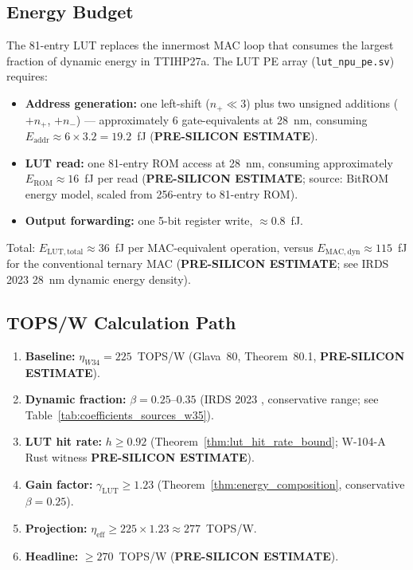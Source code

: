 \subsection{Energy Budget}

The 81-entry LUT replaces the innermost MAC loop that consumes the largest
fraction of dynamic energy in TTIHP27a.  The LUT PE array (\texttt{lut\_npu\_pe.sv})
requires:
\begin{itemize}
  \item \textbf{Address generation:} one left-shift ($n_{+} \ll 3$) plus two
    unsigned additions ($+n_{+}$, $+n_{-}$) — approximately 6 gate-equivalents
    at 28~nm, consuming $E_{\mathrm{addr}} \approx 6 \times 3.2 = 19.2$~fJ
    (\textbf{PRE-SILICON ESTIMATE}).
  \item \textbf{LUT read:} one 81-entry ROM access at 28~nm, consuming approximately
    $E_{\mathrm{ROM}} \approx 16$~fJ per read
    (\textbf{PRE-SILICON ESTIMATE}; source: \cite{bitrom_2025} BitROM energy model,
    scaled from 256-entry to 81-entry ROM).
  \item \textbf{Output forwarding:} one 5-bit register write, $\approx 0.8$~fJ.
\end{itemize}

Total: $E_{\mathrm{LUT,total}} \approx 36$~fJ per MAC-equivalent operation,
versus $E_{\mathrm{MAC,dyn}} \approx 115$~fJ for the conventional ternary MAC
(\textbf{PRE-SILICON ESTIMATE}; see IRDS 2023 \cite{irds2023} 28~nm dynamic
energy density).

\subsection{TOPS/W Calculation Path}

\begin{enumerate}
  \item \textbf{Baseline:} $\eta_{W34} = 225$~TOPS/W (Glava~80,
    Theorem~80.1, \textbf{PRE-SILICON ESTIMATE}).
  \item \textbf{Dynamic fraction:} $\beta = 0.25$--$0.35$
    (IRDS 2023 \cite{irds2023}, conservative range;
    see Table~\ref{tab:coefficients_sources_w35}).
  \item \textbf{LUT hit rate:} $h \geq 0.92$
    (Theorem~\ref{thm:lut_hit_rate_bound};
    W-104-A Rust witness \textbf{PRE-SILICON ESTIMATE}).
  \item \textbf{Gain factor:} $\gamma_{\mathrm{LUT}} \geq 1.23$
    (Theorem~\ref{thm:energy_composition}, conservative $\beta = 0.25$).
  \item \textbf{Projection:} $\eta_{\mathrm{eff}} \geq 225 \times 1.23 \approx 277$~TOPS/W.
  \item \textbf{Headline:} $\geq 270$~TOPS/W (\textbf{PRE-SILICON ESTIMATE}).
\end{enumerate}

